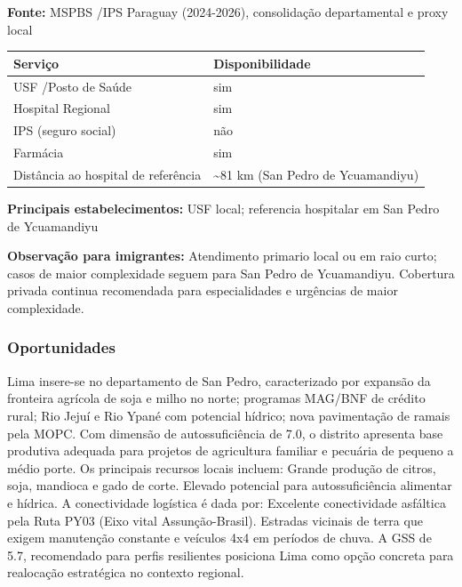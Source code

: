 \textbf{Fonte:} MSPBS /\allowbreak  IPS Paraguay (2024-2026), consolidação
departamental e proxy local

{\def\LTcaptype{none} %
\begin{longtable}[]{@{}
  >{\raggedright\arraybackslash}p{}
  >{\raggedright\arraybackslash}p{}@{}}
\toprule\noalign{}
\begin{minipage}[b]{\linewidth}\raggedright
Serviço
\end{minipage} & \begin{minipage}[b]{\linewidth}\raggedright
Disponibilidade
\end{minipage} \\
\midrule\noalign{}
\endhead
\bottomrule\noalign{}
\endlastfoot
USF /\allowbreak  Posto de Saúde & sim \\
Hospital Regional & sim \\
IPS (seguro social) & não \\
Farmácia & sim \\
Distância ao hospital de referência & \textasciitilde81 km (San Pedro de
Ycuamandiyu) \\
\end{longtable}
}

\textbf{Principais estabelecimentos:} USF local; referencia hospitalar
em San Pedro de Ycuamandiyu

\textbf{Observação para imigrantes:} Atendimento primario local ou em
raio curto; casos de maior complexidade seguem para San Pedro de
Ycuamandiyu. Cobertura privada continua recomendada para especialidades
e urgências de maior complexidade.
\newpage

\subsubsection*{Oportunidades}\label{oport-lima-0206}
Lima insere-se no departamento de San Pedro, caracterizado por expansão da fronteira agrícola de soja e milho no norte; programas MAG/BNF de crédito rural; Rio Jejuí e Rio Ypané com potencial hídrico; nova pavimentação de ramais pela MOPC. Com dimensão de autossuficiência de 7.0, o distrito apresenta base produtiva adequada para projetos de agricultura familiar e pecuária de pequeno a médio porte. Os principais recursos locais incluem: Grande produção de citros, soja, mandioca e gado de corte. Elevado potencial para autossuficiência alimentar e hídrica. A conectividade logística é dada por: Excelente conectividade asfáltica pela Ruta PY03 (Eixo vital Assunção-Brasil). Estradas vicinais de terra que exigem manutenção constante e veículos 4x4 em períodos de chuva. A GSS de 5.7, recomendado para perfis resilientes posiciona Lima como opção concreta para realocação estratégica no contexto regional.

